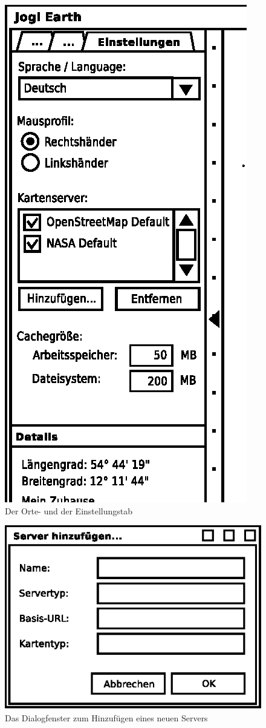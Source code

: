 \documentclass[10pt]{scrreprt}
\begin{document}
\begin{figure}
\begin{minipage}[c]{6cm}
		\includegraphics[scale=0.9]{GUI-Einstellungen.eps}
	\end{minipage}
	\caption{Der Orte- und der Einstellungstab}
\end{figure}
\begin{figure}
	\centering
	\includegraphics[scale=0.9]{GUI-ServerDialog.eps}
	\caption{Das Dialogfenster zum Hinzufügen eines neuen Servers}
\end{figure}
\end{document}
